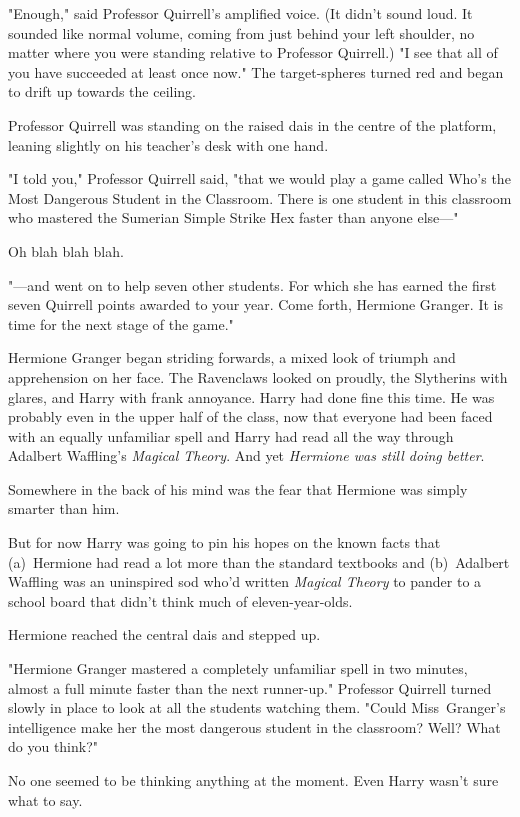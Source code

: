 "Enough," said Professor Quirrell’s amplified voice. (It didn’t sound loud. It
sounded like normal volume, coming from just behind your left shoulder, no
matter where you were standing relative to Professor Quirrell.) "I see that all
of you have succeeded at least once now." The target-spheres turned red and
began to drift up towards the ceiling.

Professor Quirrell was standing on the raised dais in the centre of the
platform, leaning slightly on his teacher’s desk with one hand.

"I told you," Professor Quirrell said, "that we would play a game called Who’s
the Most Dangerous Student in the Classroom. There is one student in this
classroom who mastered the Sumerian Simple Strike Hex faster than anyone
else—"

Oh blah blah blah.

"—and went on to help seven other students. For which she has earned the
first seven Quirrell points awarded to your year. Come forth, Hermione Granger.
It is time for the next stage of the game."

Hermione Granger began striding forwards, a mixed look of triumph and
apprehension on her face. The Ravenclaws looked on proudly, the Slytherins with
glares, and Harry with frank annoyance. Harry had done fine this time. He was
probably even in the upper half of the class, now that everyone had been faced
with an equally unfamiliar spell and Harry had read all the way through
Adalbert Waffling’s \emph{Magical Theory}. And yet \emph{Hermione was still
doing better}.

Somewhere in the back of his mind was the fear that Hermione was simply smarter
than him.

But for now Harry was going to pin his hopes on the known facts that (a)~Hermione
had read a lot more than the standard textbooks and (b)~Adalbert
Waffling was an uninspired sod who’d written \emph{Magical Theory} to pander to
a school board that didn’t think much of eleven-year-olds.

Hermione reached the central dais and stepped up.

"Hermione Granger mastered a completely unfamiliar spell in two minutes, almost
a full minute faster than the next runner-up." Professor Quirrell turned slowly
in place to look at all the students watching them. "Could Miss~Granger’s
intelligence make her the most dangerous student in the classroom? Well? What
do you think?"

No one seemed to be thinking anything at the moment. Even Harry wasn’t sure
what to say.

